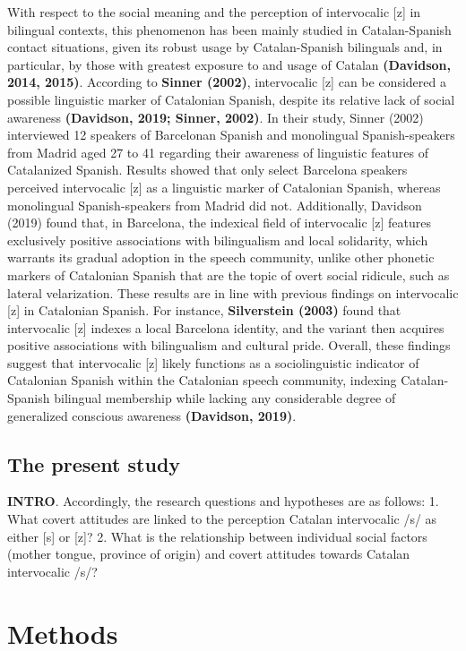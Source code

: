 \documentclass[
  a4paper,
  11pt,
  twocolumn]{article}
\begin{document}
With respect to the social meaning and the perception of intervocalic
{[}z{]} in bilingual contexts, this phenomenon has been mainly studied
in Catalan-Spanish contact situations, given its robust usage by
Catalan-Spanish bilinguals and, in particular, by those with greatest
exposure to and usage of Catalan \textbf{(Davidson, 2014, 2015)}.
According to \textbf{Sinner (2002)}, intervocalic {[}z{]} can be
considered a possible linguistic marker of Catalonian Spanish, despite
its relative lack of social awareness \textbf{(Davidson, 2019; Sinner,
2002)}. In their study, Sinner (2002) interviewed 12 speakers of
Barcelonan Spanish and monolingual Spanish-speakers from Madrid aged 27
to 41 regarding their awareness of linguistic features of Catalanized
Spanish. Results showed that only select Barcelona speakers perceived
intervocalic {[}z{]} as a linguistic marker of Catalonian Spanish,
whereas monolingual Spanish-speakers from Madrid did not. Additionally,
Davidson (2019) found that, in Barcelona, the indexical field of
intervocalic {[}z{]} features exclusively positive associations with
bilingualism and local solidarity, which warrants its gradual adoption
in the speech community, unlike other phonetic markers of Catalonian
Spanish that are the topic of overt social ridicule, such as lateral
velarization. These results are in line with previous findings on
intervocalic {[}z{]} in Catalonian Spanish. For instance,
\textbf{Silverstein (2003)} found that intervocalic {[}z{]} indexes a
local Barcelona identity, and the variant then acquires positive
associations with bilingualism and cultural pride. Overall, these
findings suggest that intervocalic {[}z{]} likely functions as a
sociolinguistic indicator of Catalonian Spanish within the Catalonian
speech community, indexing Catalan-Spanish bilingual membership while
lacking any considerable degree of generalized conscious awareness
\textbf{(Davidson, 2019)}.

\subsection{The present study}

\textbf{INTRO}. Accordingly, the research questions and hypotheses are
as follows: 1. What covert attitudes are linked to the perception
Catalan intervocalic /s/ as either {[}s{]} or {[}z{]}? 2. What is the
relationship between individual social factors (mother tongue, province
of origin) and covert attitudes towards Catalan intervocalic /s/?

\section{Methods}
\end{document}
